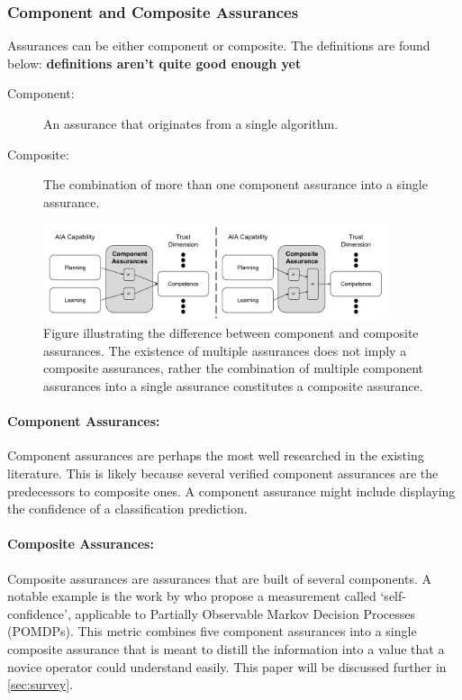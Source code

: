 \subsubsection{Component and Composite Assurances}
Assurances can be either component or composite. The definitions are found below: \textbf{definitions aren't quite good enough yet}

\begin{description}
    \item [Component:] An assurance that originates from a single algorithm.
    \item [Composite:] The combination of more than one component assurance into a single assurance. 
\end{description}

\begin{figure}[!htbp]
    \centering
    \includegraphics[width=0.9\textwidth]{Figures/Assurance_component_composite.pdf}
    \caption{Figure illustrating the difference between component and composite assurances. The existence of multiple assurances does not imply a composite assurances, rather the combination of multiple component assurances into a single assurance constitutes a composite assurance.}
    \label{fig:assurance_mapping}
\end{figure}

\paragraph{Component Assurances:} Component assurances are perhaps the most well researched in the existing literature. This is likely because several verified component assurances are the predecessors to composite ones. A component assurance might include displaying the confidence of a classification prediction.

\paragraph{Composite Assurances:} Composite assurances are assurances that are built of several components. A notable example is the work by \citet{Aitken2016-cv} who propose a measurement called `self-confidence', applicable to Partially Observable Markov Decision Processes (POMDPs). This metric combines five component assurances into a single composite assurance that is meant to distill the information into a value that a novice operator could understand easily. This paper will be discussed further in \ref{sec:survey}. 
